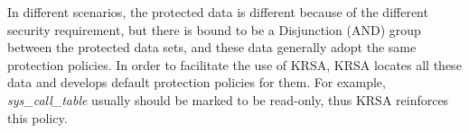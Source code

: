 \documentclass[conference]{IEEEtran}
\begin{document}



%


In different scenarios, the protected data is different because of the different security requirement, but there is bound to be a Disjunction (AND) group between the protected data sets, and these data generally adopt the same protection policies. In order to facilitate the use of KRSA, KRSA locates all these data and develops default protection policies for them. For example, \textit{sys\_call\_table} usually should be marked to be read-only, thus KRSA reinforces this policy. 
\end{document}
